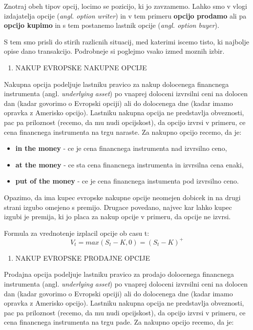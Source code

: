 \documentclass[
]{article}
\providecommand{\tightlist}{%
  \setlength{\itemsep}{0pt}\setlength{\parskip}{0pt}}
\begin{document}
Znotraj obeh tipov opcij, locimo se pozicijo, ki jo zavzamemo. Lahko smo
v vlogi izdajatelja opcije (\emph{angl. option writer}) in v tem primeru
\textbf{opcijo prodamo} ali pa \textbf{opcijo kupimo} in s tem postanemo
lastnik opcije (\emph{angl. option buyer}).

S tem smo prisli do stirih razlicnih situacij, med katerimi iscemo
tisto, ki najbolje opise dano transakcijo. Podrobneje si poglejmo vsako
izmed moznih izbir.

\begin{enumerate}
\def\labelenumi{\arabic{enumi}.}
\tightlist
\item
  NAKUP EVROPSKE NAKUPNE OPCIJE
\end{enumerate}

Nakupna opcija podeljuje lastniku pravico za nakup dolocenega financnega
instrumenta (angl. \emph{underlying asset}) po vnaprej doloceni
izvrsilni ceni na dolocen dan (kadar govorimo o Evropski opciji) ali do
dolocenega dne (kadar imamo opravka z Amerisko opcijo). Lastniku nakupna
opcija ne predstavlja obveznosti, pac pa priloznost (recemo, da mu nudi
opcijskost), da opcijo izvrsi v primeru, ce cena financnega instrumenta
na trgu naraste. Za nakupno opcijo recemo, da je:

\begin{itemize}
\tightlist
\item
  \textbf{in the money} - ce je cena financnega instrumenta nad
  izvrsilno ceno,
\item
  \textbf{at the money} - ce sta cena financnega instrumenta in
  izvrsilna cena enaki,
\item
  \textbf{put of the money} - ce je cena financnega instumenta pod
  izvrsilno ceno.
\end{itemize}

Opazimo, da ima kupec evropske nakupne opcije neomejen dobicek in na
drugi strani izgubo omejeno s premijo. Drugace povedano, najvec kar
lahko kupec izgubi je premija, ki jo placa za nakup opcije v primeru, da
opcije ne izvrsi.

Formula za vrednotenje izplacil opcije ob casu t:
\[ V_t = max(S_t-K,0) = (S_t - K)^+ \]

\begin{enumerate}
\def\labelenumi{\arabic{enumi}.}
\setcounter{enumi}{1}
\tightlist
\item
  NAKUP EVROPSKE PRODAJNE OPCIJE
\end{enumerate}

Prodajna opcija podeljuje lastniku pravico za prodajo dolocenega
financnega instrumenta (angl. \emph{underlying asset}) po vnaprej
doloceni izvrsilni ceni na dolocen dan (kadar govorimo o Evropski
opciji) ali do dolocenega dne (kadar imamo opravka z Amerisko opcijo).
Lastniku nakupna opcija ne predstavlja obveznosti, pac pa priloznost
(recemo, da mu nudi opcijskost), da opcijo izvrsi v primeru, ce cena
financnega instrumenta na trgu pade. Za nakupno opcijo recemo, da je:
\end{document}
